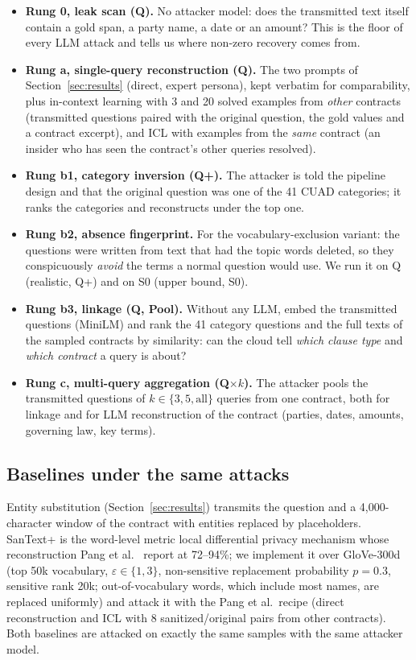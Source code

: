 \begin{itemize}
  \item \textbf{Rung 0, leak scan (Q).} No attacker model: does the transmitted text itself contain a gold span, a party name, a date or an amount? This is the floor of every LLM attack and tells us where non-zero recovery comes from.
  \item \textbf{Rung a, single-query reconstruction (Q).} The two prompts of Section~\ref{sec:results} (direct, expert persona), kept verbatim for comparability, plus in-context learning with 3 and 20 solved examples from \emph{other} contracts (transmitted questions paired with the original question, the gold values and a contract excerpt), and ICL with examples from the \emph{same} contract (an insider who has seen the contract's other queries resolved).
  \item \textbf{Rung b1, category inversion (Q+).} The attacker is told the pipeline design and that the original question was one of the 41 CUAD categories; it ranks the categories and reconstructs under the top one.
  \item \textbf{Rung b2, absence fingerprint.} For the vocabulary-exclusion variant: the questions were written from text that had the topic words deleted, so they conspicuously \emph{avoid} the terms a normal question would use. We run it on Q (realistic, Q+) and on S0 (upper bound, S0).
  \item \textbf{Rung b3, linkage (Q, Pool).} Without any LLM, embed the transmitted questions (MiniLM) and rank the 41 category questions and the full texts of the sampled contracts by similarity: can the cloud tell \emph{which clause type} and \emph{which contract} a query is about?
  \item \textbf{Rung c, multi-query aggregation (Q$\times k$).} The attacker pools the transmitted questions of $k\in\{3,5,\text{all}\}$ queries from one contract, both for linkage and for LLM reconstruction of the contract (parties, dates, amounts, governing law, key terms).
\end{itemize}

\subsection{Baselines under the same attacks}
\label{sec:adaptive:baselines}

Entity substitution (Section~\ref{sec:results}) transmits the question and a 4{,}000-character window of the contract with entities replaced by placeholders. SanText+ \cite{yue2021} is the word-level metric local differential privacy mechanism whose reconstruction Pang et al.\ \cite{pang2024} report at 72--94\%; we implement it over GloVe-300d (top 50k vocabulary, $\varepsilon\in\{1,3\}$, non-sensitive replacement probability $p{=}0.3$, sensitive rank 20k; out-of-vocabulary words, which include most names, are replaced uniformly) and attack it with the Pang et al.\ recipe (direct reconstruction and ICL with 8 sanitized/original pairs from other contracts). Both baselines are attacked on exactly the same samples with the same attacker model.

